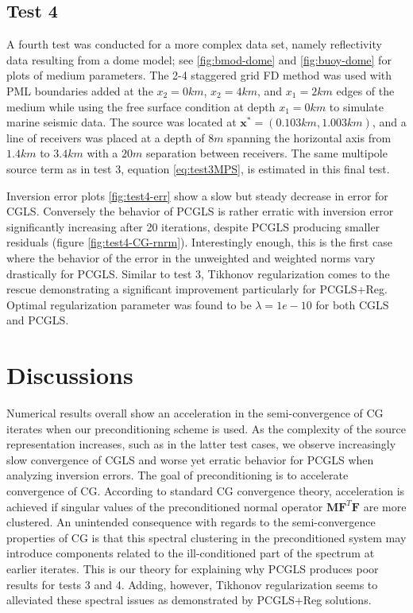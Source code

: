 
\subsection{Test 4}

A fourth test was conducted for a more complex data set, namely reflectivity data resulting from a dome model; see \ref{fig:bmod-dome} and \ref{fig:buoy-dome} for plots of medium parameters.
The 2-4 staggered grid FD method was used with PML boundaries added at the $x_2=0km$, $x_2=4km$, and $x_1=2km$ edges of the medium while using the free surface condition at depth $x_1=0km$ to simulate marine seismic data.
The source was located at $\mathbf x^*=(0.103km,1.003km)$, and a line of receivers was placed at a depth of $8m$ spanning the horizontal axis from $1.4km$ to $3.4km$ with a $20m$ separation between receivers.
The same multipole source term as in test 3, equation \ref{eq:test3MPS}, is estimated in this final test.

Inversion error plots \ref{fig:test4-err} show a slow but steady decrease in error for CGLS.
Conversely the behavior of PCGLS is rather erratic with inversion error significantly increasing after 20 iterations, despite PCGLS producing smaller residuals (figure \ref{fig:test4-CG-rnrm}).
Interestingly enough, this is the first case where the behavior of the error in the unweighted and weighted norms vary drastically for PCGLS.
Similar to test 3, Tikhonov regularization comes to the rescue demonstrating a significant improvement particularly for PCGLS+Reg.
Optimal regularization parameter was found to be $\lambda=1e-10$ for both CGLS and PCGLS.


\section{Discussions}

Numerical results overall show an acceleration in the semi-convergence of CG iterates when our preconditioning scheme is used.
As the complexity of the source representation increases, such as in the latter test cases, we observe increasingly slow convergence of CGLS and worse yet erratic behavior for PCGLS when analyzing inversion errors.
The goal of preconditioning is to accelerate convergence of CG.
According to standard CG convergence theory, acceleration is achieved if singular values of the preconditioned normal operator $\mathbf M\mathbf F^T\mathbf F$ are more clustered.
An unintended consequence with regards to the semi-convergence properties of CG is that this spectral clustering in the preconditioned system may introduce components related to the ill-conditioned part of the spectrum at earlier iterates.
This is our theory for explaining why PCGLS produces poor results for tests 3 and 4.
Adding, however, Tikhonov regularization seems to alleviated these spectral issues as demonstrated by PCGLS+Reg solutions.

